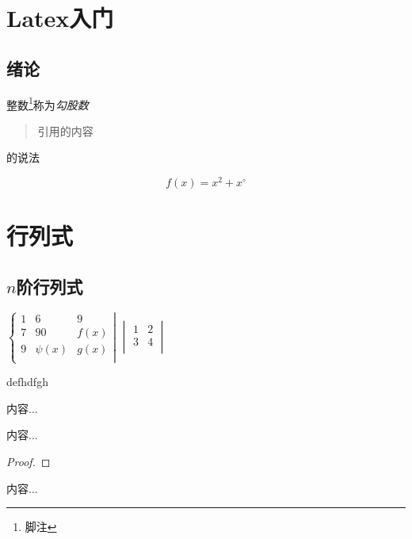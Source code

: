 \ifx\allfiles\undefined


%  
\else
\fi
\chapter{Latex入门}
\section{绪论}

整数\footnote{脚注}称为\emph{勾股数}

\begin{quote}
\kaishu 引用的内容
\end{quote}
的说法

\begin{equation}
	f(x)=x^2+x^\circ 
\end{equation}




	\chapter{行列式}
	\section{$n$阶行列式}
$
\left \{ \begin{matrix}
	1 &6   & 9 \\
	7 &90 & f(x)  \\
	9 & \psi(x) &g(x) \\
\end{matrix} \right | 
$
$ \begin{vmatrix}
	1&2\\
	3&4\\
\end{vmatrix} $



\begin{definition}
	defhdfgh
\end{definition}
\begin{lemma}
	内容...
\end{lemma}
\begin{theorem}
	内容...
\end{theorem}
\begin{proof}
\lipsum[3]
\end{proof}
\begin{example}
	内容...
\end{example}
